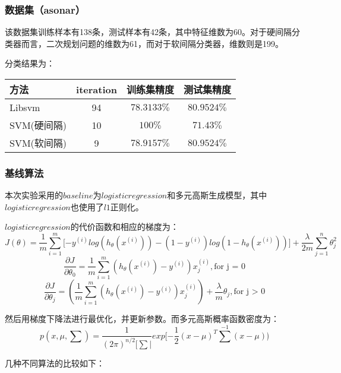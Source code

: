 \documentclass[12pt]{article}
\begin{document}
	       \subsubsection{数据集（asonar）}
	          
	          该数据集训练样本有138条，测试样本有42条，其中特征维数为60。对于硬间隔分类器而言，二次规划问题的维数为61，而对于软间隔分类器，维数则是199。
	          
	          分类结果为：
	          
	          \vspace{10pt}
	          \begin{tabular}{|l|c|c|c|}
	          	\hline
	          	方法 & iteration & 训练集精度 & 测试集精度  \\\hline
	          	Libsvm & 94 & $78.3133\%$ & $80.9524\%$  \\\hline
	          	SVM(硬间隔) & 10 & $100\%$ & $71.43\%$  \\\hline
	          	SVM(软间隔) & 9 & $78.9157\%$ & $80.9524\%$  \\\hline
	          \end{tabular}
	          \vspace{15pt}
	       
	       \subsubsection{基线算法}
	       本次实验采用的$baseline$为$logistic regression$和多元高斯生成模型，其中$logistic regression$也使用了$l1$正则化。
	       
	       $logistic regression$的代价函数和相应的梯度为：
	       \[J(\theta)= \frac{1}{m} \sum \limits_{i=1}^{m} \lbrack -y^{(i)}log(h_{\theta}(x^{(i)})) -(1-y^{(i)})log(1-h_{\theta}(x^{(i)})) \rbrack + \frac{\lambda}{2m} \sum \limits_{j=1}^n \theta_j^2 \]
	       \[\frac{\partial J}{\partial \theta_0} = \frac{1}{m} \sum \limits_{i=1}^m (h_{\theta}(x^{(i)}) - y^{(i)}) x_j^{(i)},\text{for j = 0} \]
	       \[\frac{\partial J}{\partial \theta_j} = (\frac{1}{m} \sum \limits_{i=1}^m (h_{\theta}(x^{(i)}) - y^{(i)}) x_j^{(i)}) + \frac{\lambda}{m}\theta_j, \text{for j > 0} \]
	          
	       然后用梯度下降法进行最优化，并更新参数。而多元高斯概率函数密度为：
	       \[p(x,\mu,\sum) = \frac{1}{(2\pi)^{n/2} \lbrack \sum \rvert } exp \lbrack -\frac{1}{2}(x-\mu)^T \sum^{-1}(x-\mu) \rgroup \]   
	         
	       几种不同算法的比较如下：
	        
\end{document}
